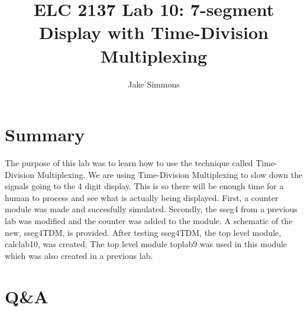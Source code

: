 \documentclass[11pt]{article}
\begin{document}
\title{ELC 2137 Lab 10: 7-segment Display with Time-Division Multiplexing}
\author{Jake Simmons}

\maketitle


\section*{Summary}

The purpose of this lab was to learn how to use the technique called Time-Division Multiplexing. We are using Time-Division Multiplexing to slow down the signals going to the 4 digit display. This is so there will be enough time for a human to process and see what is actually being displayed. First, a counter module was made and succesfully simulated. Secondly, the sseg4 from a previous lab was modified and the counter was added to the module. A schematic of the new, sseg4TDM, is provided. After testing sseg4TDM, the top level module, calclab10, was created. The top level module toplab9 was used in this module which was also created in a previous lab.  

\clearpage
\section*{Q\&A}
\end{document}
